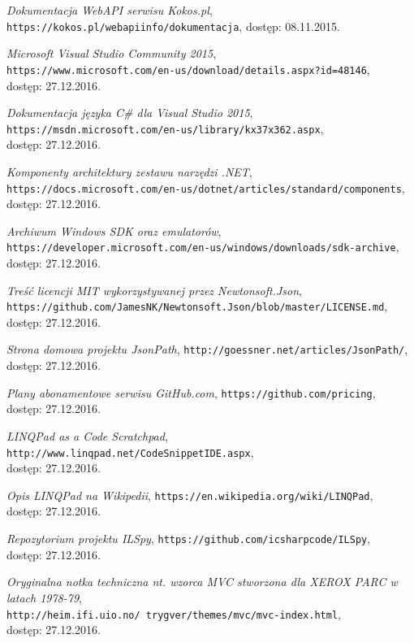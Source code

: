 \documentclass[a4paper,twoside,titlepage,openright]{book}
\begin{document}
\begin{thebibliography}{99}
 \textit{Dokumentacja WebAPI serwisu Kokos.pl}, 
\texttt{https://kokos.pl/webapiinfo/dokumentacja}, dostęp: 08.11.2015.

 \textit{Microsoft Visual Studio Community 2015}, \\
\texttt{https://www.microsoft.com/en-us/download/details.aspx?id=48146}, \\dostęp: 27.12.2016.

 \textit{Dokumentacja języka C\# dla Visual Studio 2015}, \\
\texttt{https://msdn.microsoft.com/en-us/library/kx37x362.aspx}, \\dostęp: 27.12.2016.

 \textit{Komponenty architektury zestawu narzędzi .NET}, \\
\texttt{https://docs.microsoft.com/en-us/dotnet/articles/standard/components},\\ dostęp: 27.12.2016.

 \textit{Archiwum Windows SDK oraz emulatorów}, \\
\texttt{https://developer.microsoft.com/en-us/windows/downloads/sdk-archive}, \\dostęp: 27.12.2016.

 \textit{Treść licencji MIT wykorzystywanej przez Newtonsoft.Json}, \\
\texttt{https://github.com/JamesNK/Newtonsoft.Json/blob/master/LICENSE.md}, \\dostęp: 27.12.2016.

 \textit{Strona domowa projektu JsonPath}, 
\texttt{http://goessner.net/articles/JsonPath/}, \\dostęp: 27.12.2016.

 \textit{Plany abonamentowe serwisu GitHub.com}, 
\texttt{https://github.com/pricing}, \\dostęp: 27.12.2016.

 \textit{LINQPad as a Code Scratchpad}, 
\texttt{http://www.linqpad.net/CodeSnippetIDE.aspx}, \\dostęp: 27.12.2016.

 \textit{Opis LINQPad na Wikipedii}, 
\texttt{https://en.wikipedia.org/wiki/LINQPad}, \\dostęp: 27.12.2016.

 \textit{Repozytorium projektu ILSpy}, 
\texttt{https://github.com/icsharpcode/ILSpy}, \\dostęp: 27.12.2016.

 \textit{Oryginalna notka techniczna nt. wzorca MVC stworzona dla XEROX PARC w latach 1978-79}, \\
\texttt{http://heim.ifi.uio.no/~trygver/themes/mvc/mvc-index.html}, \\dostęp: 27.12.2016.




\end{thebibliography}
\end{document}
